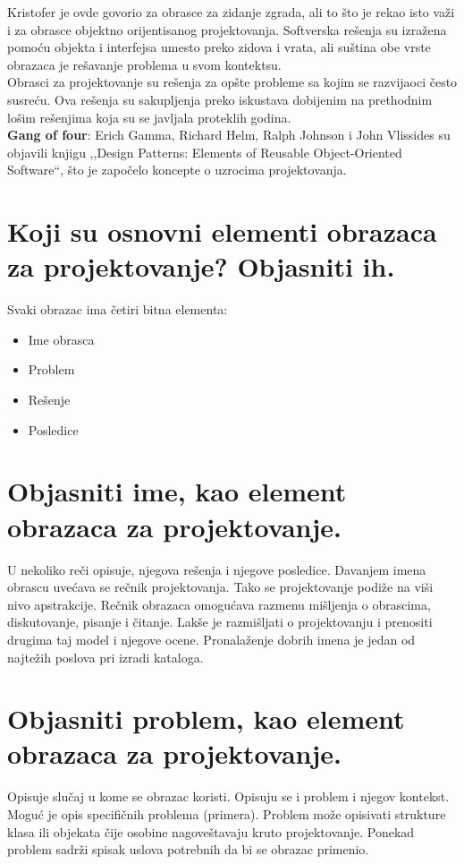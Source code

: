 \documentclass[a4paper]{article}
\begin{document}
  Kristofer je ovde govorio za obrasce za zidanje zgrada, ali to što je rekao isto važi i za
  obrasce objektno orijentisanog projektovanja. Softverska rešenja su izražena pomoću objekta i 
  interfejsa umesto preko zidova i vrata, ali suština obe vrste obrazaca je rešavanje problema
  u svom kontektsu.\\
  \indent Obrasci za projektovanje su rešenja za opšte probleme sa kojim se razvijaoci često susreću.
  Ova rešenja su sakupljenja preko iskustava dobijenim na prethodnim lošim rešenjima koja su
  se javljala proteklih godina.\\
  \indent \textbf{Gang of four}: Erich Gamma, Richard Helm, Ralph Johnson i John Vlissides su objavili
  knjigu ,,Design Patterns: Elements of Reusable Object-Oriented Software``, što je započelo 
  koncepte o uzrocima projektovanja.

\section{Koji su osnovni elementi obrazaca za projektovanje? Objasniti ih.}
  \noindent Svaki obrazac ima četiri bitna elementa:
  \begin{itemize}
    \item Ime obrasca
    \item Problem
    \item Rešenje
    \item Posledice
  \end{itemize}

\section{Objasniti ime, kao element obrazaca za projektovanje.}
  U nekoliko reči opisuje, njegova rešenja i njegove posledice.
  Davanjem imena obrascu uvećava se rečnik projektovanja.
  Tako se projektovanje podiže na viši nivo apstrakcije.
  Rečnik obrazaca omogućava razmenu mišljenja o obrascima, diskutovanje, pisanje i čitanje.
  Lakše je razmišljati o projektovanju i prenositi drugima taj model i njegove ocene.
  Pronalaženje dobrih imena je jedan od najtežih poslova pri izradi kataloga.

\section{Objasniti problem, kao element obrazaca za projektovanje.}
  Opisuje slučaj u kome se obrazac koristi.
  Opisuju se i problem i njegov kontekst.
  Moguć je opis specifičnih problema (primera).
  Problem može opisivati strukture klasa ili objekata čije osobine nagoveštavaju kruto 
  projektovanje. Ponekad problem sadrži spisak uslova potrebnih da bi se obrazac primenio.
\end{document}
